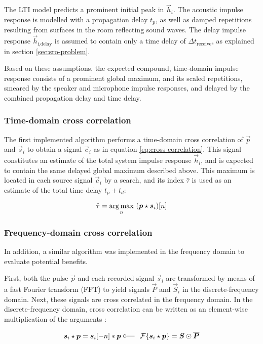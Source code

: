 \documentclass[a4paper, notitlepage]{report}
\begin{document}
The LTI model predicts a prominent initial peak in $\vec{h}_i$. The acoustic impulse response is modelled with a propagation delay $t_p$, as well as damped repetitions resulting from surfaces in the room reflecting sound waves. The delay impulse response $\vec{h}_{\text{i,delay}}$ is assumed to contain only a time delay of $\Delta t_{\text{receive}}$, as explained in section \ref{sec:sro-problem}.

Based on these assumptions, the expected compound, time-domain impulse response consists of a prominent global maximum, and its scaled repetitions, smeared by the speaker and microphone impulse responses, and delayed by the combined propagation delay and time delay.

\subsubsection{Time-domain cross correlation}
The first implemented algorithm performs a time-domain cross correlation of $\vec{p}$ and $\vec{s}_i$ to obtain a signal $\vec{c}_i$ as in equation \ref{eq:cross-correlation}. This signal constitutes an estimate of the total system impulse response $\vec{h}_i$, and is expected to contain the same delayed global maximum described above. This maximum is located in each source signal $\vec{c}_i$ by a search, and its index $\hat{\tau}$ is used as an estimate of the total time delay $t_p + t_d$:

\begin{equation}
\hat{\tau} = \operatornamewithlimits{arg\,max}_n~(\vec{p} \star \vec{s}_i)[n]
\end{equation}

\subsubsection{Frequency-domain cross correlation}
\label{subsubsec:fd_algo}
In addition, a similar algorithm was implemented in the frequency domain to evaluate potential benefits.

First, both the pulse $\vec{p}$ and each recorded signal $\vec{s}_i$ are transformed by means of a fast Fourier transform (FFT) to yield signals $\vec{P}$ and $\vec{S}_i$ in the discrete-frequency domain. Next, these signals are cross correlated in the frequency domain. In the discrete-frequency domain, cross correlation can be written as an element-wise multiplication of the arguments \cite[p. 310]{Hansen2014}:

\begin{equation}
\label{eq:xcorr-fd}
\vec{s}_i \star \vec{p} = \vec{s}_i[-n] * \vec{p} ~\fourier ~\mathcal{F}\{\vec{s}_i \star \vec{p}\} = \vec{S} \odot \overline{\vec{P}}
\end{equation}
\end{document}
